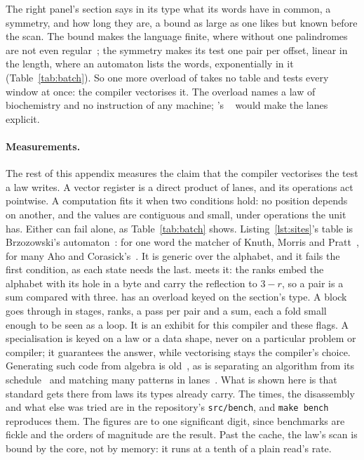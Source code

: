 The right panel's section says in its type what its words have in common, a symmetry, and how long they are, a bound as large as one likes but known before the scan.
The bound makes the language finite, where without one palindromes are not even regular~\cite{kari2010watson}; the symmetry makes its test one pair per offset, linear in the length, where an automaton lists the words, exponentially in it (Table~\ref{tab:batch}).
So one more overload of  takes no table and tests every window at once: the compiler vectorises it.
The overload names a law of biochemistry and no instruction of any machine; 's ~\cite{kretz2024simd} would make the lanes explicit.

\paragraph{Measurements.}
The rest of this appendix measures the claim that the compiler vectorises the test a law writes.
A vector register is a direct product of lanes, and its operations act pointwise.
A computation fits it when two conditions hold: no position depends on another, and the values are contiguous and small, under operations the unit has.
Either can fail alone, as Table~\ref{tab:batch} shows.
Listing~\ref{lst:sites}'s table is Brzozowski's automaton~\cite{brzozowski1964derivatives}: for one word the matcher of Knuth, Morris and Pratt~\cite{knuth1977fast}, for many Aho and Corasick's~\cite{aho1975efficient}.
It is generic over the alphabet, and it fails the first condition, as each state needs the last.
 meets it: the ranks embed the alphabet with its hole in a byte and carry the reflection to $3 - r$, so a pair is a sum compared with three.
 has an overload keyed on the section's type.
A block goes through in stages, ranks, a pass per pair and a sum, each a fold small enough to be seen as a loop.
It is an exhibit for this compiler and these flags.
A specialisation is keyed on a law or a data shape, never on a particular problem or compiler; it guarantees the answer, while vectorising stays the compiler's choice.
Generating such code from algebra is old~\cite{frigo2005fftw,puschel2005spiral}, as is separating an algorithm from its schedule~\cite{ragankelley2013halide} and matching many patterns in lanes~\cite{wang2019hyperscan}.
What is shown here is that standard  gets there from laws its types already carry.
The times, the disassembly and what else was tried are in the repository's \texttt{src/bench}, and \texttt{make bench} reproduces them.
The figures are to one significant digit, since benchmarks are fickle and the orders of magnitude are the result.
Past the cache, the law's scan is bound by the core, not by memory: it runs at a tenth of a plain read's rate.

